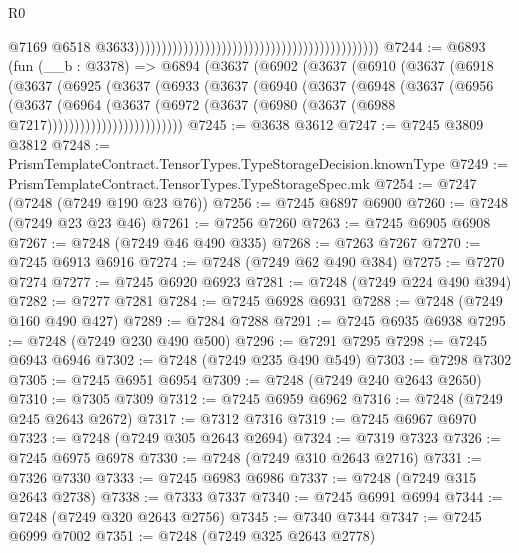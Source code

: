 \begin{lexlean}{R0}
\begin{coremodule}
                                                                                              @7169
                                                                                              @6518
                                                                                              @3633)))))))))))))))))))))))))))))))))))))))))))))
@7244 := @6893
    (fun (__b : @3378) =>
    @6894
      (@3637
        (@6902
          (@3637
            (@6910
              (@3637
                (@6918
                  (@3637
                    (@6925
                      (@3637
                        (@6933
                          (@3637
                            (@6940
                              (@3637
                                (@6948
                                  (@3637
                                    (@6956
                                      (@3637
                                        (@6964
                                          (@3637
                                            (@6972
                                              (@3637
                                                (@6980 (@3637 (@6988 @7217)))))))))))))))))))))))))
@7245 := @3638 @3612
@7247 := @7245 @3809 @3812
@7248 := PrismTemplateContract.TensorTypes.TypeStorageDecision.knownType
@7249 := PrismTemplateContract.TensorTypes.TypeStorageSpec.mk
@7254 := @7247 (@7248 (@7249 @190 @23 @76))
@7256 := @7245 @6897 @6900
@7260 := @7248 (@7249 @23 @23 @46)
@7261 := @7256 @7260
@7263 := @7245 @6905 @6908
@7267 := @7248 (@7249 @46 @490 @335)
@7268 := @7263 @7267
@7270 := @7245 @6913 @6916
@7274 := @7248 (@7249 @62 @490 @384)
@7275 := @7270 @7274
@7277 := @7245 @6920 @6923
@7281 := @7248 (@7249 @224 @490 @394)
@7282 := @7277 @7281
@7284 := @7245 @6928 @6931
@7288 := @7248 (@7249 @160 @490 @427)
@7289 := @7284 @7288
@7291 := @7245 @6935 @6938
@7295 := @7248 (@7249 @230 @490 @500)
@7296 := @7291 @7295
@7298 := @7245 @6943 @6946
@7302 := @7248 (@7249 @235 @490 @549)
@7303 := @7298 @7302
@7305 := @7245 @6951 @6954
@7309 := @7248 (@7249 @240 @2643 @2650)
@7310 := @7305 @7309
@7312 := @7245 @6959 @6962
@7316 := @7248 (@7249 @245 @2643 @2672)
@7317 := @7312 @7316
@7319 := @7245 @6967 @6970
@7323 := @7248 (@7249 @305 @2643 @2694)
@7324 := @7319 @7323
@7326 := @7245 @6975 @6978
@7330 := @7248 (@7249 @310 @2643 @2716)
@7331 := @7326 @7330
@7333 := @7245 @6983 @6986
@7337 := @7248 (@7249 @315 @2643 @2738)
@7338 := @7333 @7337
@7340 := @7245 @6991 @6994
@7344 := @7248 (@7249 @320 @2643 @2756)
@7345 := @7340 @7344
@7347 := @7245 @6999 @7002
@7351 := @7248 (@7249 @325 @2643 @2778)

\end{coremodule}
\end{lexlean}
